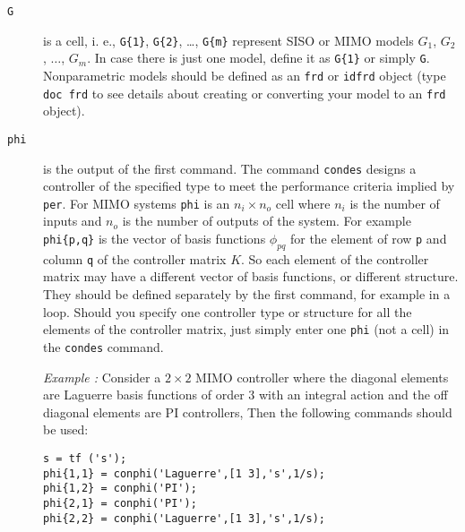 \documentclass [12pt , a4paper] {report}
\begin{document}
\begin{description}
\item[\texttt{G}] is a cell, i. e., \texttt{G\{1\}}, \texttt{G\{2\}}, \dots, \texttt{G\{m\}} represent SISO or MIMO models $G_1$, $G_2$, $\ldots$, $G_m$. In case there is just one model, define it as \texttt{G\{1\}} or simply \texttt{G}. 
Nonparametric models should be defined as an \texttt{frd} or  \texttt{idfrd} object (type \texttt{doc frd} to see details about creating or converting your model to an \texttt{frd} object).

\item[\texttt{phi}] is the output of the first command. The command \texttt{condes} designs a controller of the specified type to meet the performance criteria implied by \texttt{per}. For MIMO systems \texttt{phi} is an $n_i \times n_o$ cell where $n_i$ is the number of inputs and $n_o$ is the number of outputs of the system. For example \texttt{phi\{p,q\}} is the vector of basis functions $\phi_{pq}$ for the element of row \texttt{p} and column \texttt{q} of the controller matrix $K$. So each element of the controller matrix may have a different vector of basis functions, or different structure. They should be defined separately by the first command, for example in a loop. Should you specify one controller type or structure for all the elements of the controller matrix, just simply enter one \texttt{phi} (not a cell) in the \texttt{condes} command. 

{\it Example :} Consider a $2 \times 2$ MIMO controller where the diagonal elements are Laguerre basis functions of order 3 with an integral action and the off diagonal elements are PI controllers, Then the following commands should be used:

\begin{lstlisting}
s = tf ('s');
phi{1,1} = conphi('Laguerre',[1 3],'s',1/s);
phi{1,2} = conphi('PI');
phi{2,1} = conphi('PI');
phi{2,2} = conphi('Laguerre',[1 3],'s',1/s);
\end{lstlisting}


\end{description}
\end{document}
